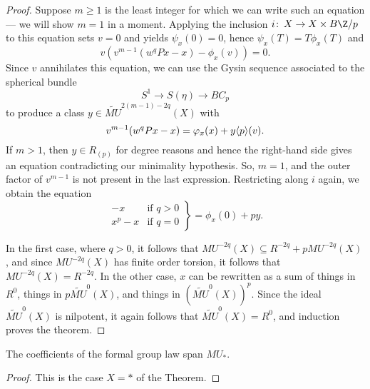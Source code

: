 \begin{proof}
Suppose $m \ge 1$ is the least integer for which we can write such an equation --- we will show $m = 1$ in a moment.  Applying the inclusion $i\co X \to X \times B\Z/p$ to this equation sets $v = 0$ and yields $\psi_x(0) = 0$, hence $\psi_x(T) = T \phi_x(T)$ and \[v (v^{m-1}(w^qPx - x) - \phi_x(v)) = 0.\]  Since $v$ annihilates this equation, we can use the Gysin sequence associated to the spherical bundle \[S^1 \to S(\eta) \to BC_p\] to produce a class $y \in \widetilde{MU}^{2(m-1)-2q}(X)$ with \[v^{m-1}(w^q P x - x) = \varphi_x(x) + y \langle p\rangle(v).\]  If $m > 1$, then $y \in R_{(p)}$ for degree reasons and hence the right-hand side gives an equation contradicting our minimality hypothesis.  So, $m = 1$, and the outer factor of $v^{m-1}$ is not present in the last expression.  Restricting along $i$ again, we obtain the equation \[\left. \begin{array}{rr} -x & \text{if $q > 0$} \\ x^p - x & \text{if $q = 0$} \end{array} \right\} = \phi_x(0) + py.\]

In the first case, where $q > 0$, it follows that $MU^{-2q}(X) \subseteq R^{-2q} + pMU^{-2q}(X)$, and since $MU^{-2q}(X)$ has finite order torsion, it follows that $MU^{-2q}(X) = R^{-2q}$.  In the other case, $x$ can be rewritten as a sum of things in $R^{0}$, things in $p \widetilde{MU}^{0}(X)$, and things in $(\widetilde{MU}^0(X))^p$.  Since the ideal $\widetilde{MU}^0(X)$ is nilpotent, it again follows that $\widetilde{MU}^0(X) = R^0$, and induction proves the theorem.
\end{proof}

\begin{corollary}\label{QuillenSurjective}
The coefficients of the formal group law span $MU_*$.
\end{corollary}
\begin{proof}
This is the case $X = *$ of the Theorem.
\end{proof}

